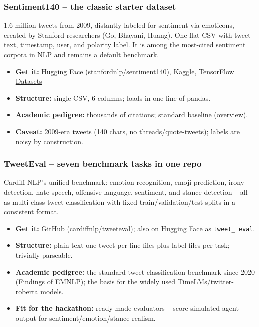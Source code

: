 \documentclass[twocolumn,10pt,letterpaper]{article}
\begin{document}
\subsubsection{Sentiment140 -- the classic starter dataset}

1.6 million tweets from 2009, distantly labeled for sentiment via emoticons, created by Stanford researchers (Go, Bhayani, Huang). One flat CSV with tweet text, timestamp, user, and polarity label. It is among the most-cited sentiment corpora in NLP and remains a default benchmark.


\begin{itemize}
\setlength{\itemsep}{0pt}
\setlength{\parskip}{0pt}
  \item \textbf{Get it:} \href{https://huggingface.co/datasets/stanfordnlp/sentiment140}{Hugging Face (stanfordnlp/sentiment140)}, \href{https://www.kaggle.com/datasets/kazanova/sentiment140}{Kaggle}, \href{https://www.tensorflow.org/datasets/catalog/sentiment140}{TensorFlow Datasets}
  \item \textbf{Structure:} single CSV, 6 columns; loads in one line of pandas.
  \item \textbf{Academic pedigree:} thousands of citations; standard baseline (\href{https://medium.com/lexiconia/the-sentiment140-dataset-a-benchmark-for-sentiment-classification-7f37313bf757}{overview}).
  \item \textbf{Caveat:} 2009-era tweets (140 chars, no threads/quote-tweets); labels are noisy by construction.
\end{itemize}

\subsubsection{TweetEval -- seven benchmark tasks in one repo}

Cardiff NLP's unified benchmark: emotion recognition, emoji prediction, irony detection, hate speech, offensive language, sentiment, and stance detection -- all as multi-class tweet classification with fixed train/validation/test splits in a consistent format.


\begin{itemize}
\setlength{\itemsep}{0pt}
\setlength{\parskip}{0pt}
  \item \textbf{Get it:} \href{https://github.com/cardiffnlp/tweeteval}{GitHub (cardiffnlp/tweeteval)}; also on Hugging Face as \texttt{tweet\_ eval}.
  \item \textbf{Structure:} plain-text one-tweet-per-line files plus label files per task; trivially parseable.
  \item \textbf{Academic pedigree:} the standard tweet-classification benchmark since 2020 (Findings of EMNLP); the basis for the widely used TimeLMs/twitter-roberta models.
  \item \textbf{Fit for the hackathon:} ready-made evaluators -- score simulated agent output for sentiment/emotion/stance realism.
\end{itemize}
\end{document}
